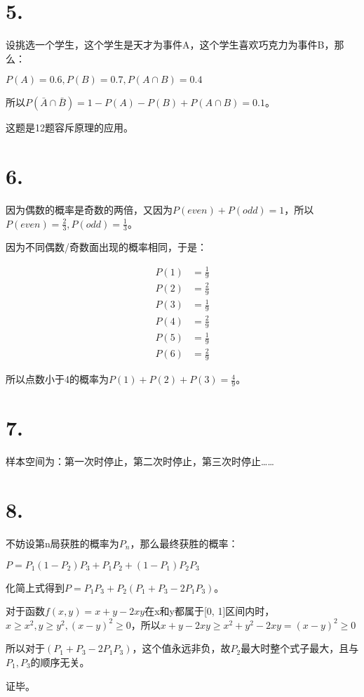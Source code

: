\documentclass[UTF8]{article}
\begin{document}
    \section*{5.}
        设挑选一个学生，这个学生是天才为事件A，这个学生喜欢巧克力为事件B，那么：

        $P(A) = 0.6, P(B) = 0.7, P(A \cap B) = 0.4$

        所以$P(\bar A \cap \bar B) = 1 - P(A) - P(B) + P(A \cap B) = 0.1$。

        这题是12题容斥原理的应用。
    \section*{6.}
        因为偶数的概率是奇数的两倍，又因为$P(even) + P(odd) = 1$，所以$P(even) = \frac{2}{3}, P(odd) = \frac{1}{3}$。

        因为不同偶数/奇数面出现的概率相同，于是：

        $$\begin{array}{rcl}
            P(1) &= \frac{1}{9} \\
            P(2) &= \frac{2}{9} \\ 
            P(3) &= \frac{1}{9} \\ 
            P(4) &= \frac{2}{9} \\ 
            P(5) &= \frac{1}{9} \\
            P(6) &= \frac{2}{9}
        \end{array}$$

        所以点数小于4的概率为$P(1) + P(2) + P(3) = \frac{4}{9}$。
    \section*{7.}
        样本空间为：第一次时停止，第二次时停止，第三次时停止……
    \section*{8.}
        不妨设第n局获胜的概率为$P_n$，那么最终获胜的概率：
        
        $P = P_1(1 - P_2)P_3 + P_1P_2 + (1 - P_1)P_2P_3$

        化简上式得到$P = P_1P_3 + P_2(P_1 + P_3 - 2P_1P_3)$。

        对于函数$f(x, y) = x + y - 2xy$在x和y都属于[0, 1]区间内时，$x \geq x^2, y \geq y^2, (x - y)^2 \geq 0$，所以$x + y - 2xy \geq x^2 + y^2 -2xy = (x - y)^2 \geq 0$

        所以对于$(P_1 + P_3 - 2P_1P_3)$，这个值永远非负，故$P_2$最大时整个式子最大，且与$P_1,P_3$的顺序无关。

        证毕。
\end{document}
